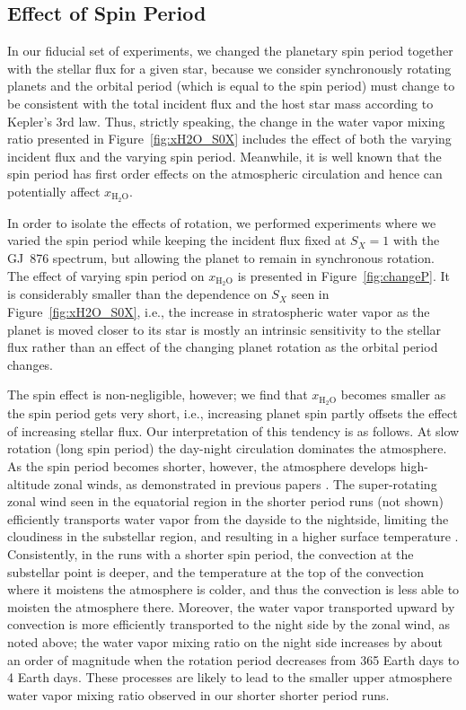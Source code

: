 \documentclass[11pt,numberedappendix,twocolappendix,]{emulateapj}
\def\water{H$_2$O}
\def\xwater{$x_\text{\water}$}
\def\wv{water vapor}
\begin{document}
\subsection{Effect of Spin Period}
\label{ss:sensitivity_Porbit}

In our fiducial set of experiments, we changed the planetary spin period together with the stellar flux for a given star, because we consider synchronously rotating planets and the orbital period (which is equal to the spin period) must change to be consistent with the total incident flux and the host star mass according to Kepler's 3rd law. 
Thus, strictly speaking, the change in the \wv{} mixing ratio presented in Figure~\ref{fig:xH2O_S0X} includes the effect of both the varying incident flux and the varying spin period. 
Meanwhile, it is well known that the spin period has first order effects on the atmospheric circulation and hence can potentially affect \xwater{}. 

In order to isolate the effects of rotation, we performed experiments where we varied the spin period while keeping the incident flux fixed at $S_X=1$ with the GJ~876 spectrum, but allowing the planet to remain in synchronous rotation. 
The effect of varying spin period on \xwater{} is presented in Figure~\ref{fig:changeP}. 
It is considerably smaller than the dependence on $S_X$ seen in Figure~\ref{fig:xH2O_S0X}, i.e., the increase in stratospheric water vapor as the planet is moved closer to its star is mostly an intrinsic sensitivity to the stellar flux rather than an effect of the changing planet rotation as the orbital period changes. 

The spin effect is non-negligible, however; we find that \xwater{} becomes smaller as the spin period gets very short, i.e., increasing planet spin partly offsets the effect of increasing stellar flux. 
Our interpretation of this tendency is as follows. 
At slow rotation (long spin period) the day-night circulation dominates the atmosphere. 
As the spin period becomes shorter, however, the atmosphere develops high-altitude zonal winds, as demonstrated in previous papers \citep{Merlis2010, Edson2011, Kopparapu2016}. 
The super-rotating zonal wind seen in the equatorial region in the shorter period runs (not shown) efficiently transports water vapor from the dayside to the nightside, limiting the cloudiness in the substellar region, and resulting in a higher surface temperature \citep{Kopparapu2016}.  
Consistently, in the runs with a shorter spin period, the convection at the substellar point is deeper, and the temperature at the top of the convection  where it moistens the atmosphere is colder, and thus the convection is less able to moisten the atmosphere there. 
Moreover, the \wv{} transported upward by convection is more efficiently transported to the night side by the zonal wind, as noted above; the water vapor mixing ratio on the night side increases by about an order of magnitude when the rotation period decreases from 365 Earth days to 4 Earth days. 
These processes are likely to lead to the smaller upper atmosphere \wv{} mixing ratio observed in our shorter shorter period runs. 
\end{document}
